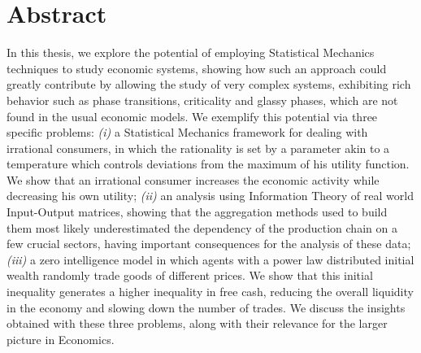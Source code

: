 \chapter*{Abstract}

In this thesis, we explore the potential of employing Statistical Mechanics techniques to study economic systems, showing how such an approach could greatly contribute by allowing the study of very complex systems, exhibiting rich behavior such as phase transitions, criticality and glassy phases, which are not found in the usual economic models. We exemplify this potential via three specific problems: \textit{(i)} a Statistical Mechanics framework for dealing with irrational consumers, in which the rationality is set by a parameter akin to a temperature which controls deviations from the maximum of his utility function. We show that an irrational consumer increases the economic activity while decreasing his own utility; \textit{(ii)} an analysis using Information Theory of real world Input-Output matrices, showing that the aggregation methods used to build them most likely underestimated the dependency of the production chain on a few crucial sectors, having important consequences for the analysis of these data; \textit{(iii)} a zero intelligence model in which agents with a power law distributed initial wealth randomly trade goods of different prices. We show that this initial inequality generates a higher inequality in free cash, reducing the overall liquidity in the economy and slowing down the number of trades. We discuss the insights obtained with these three problems, along with their relevance for the larger picture in Economics.